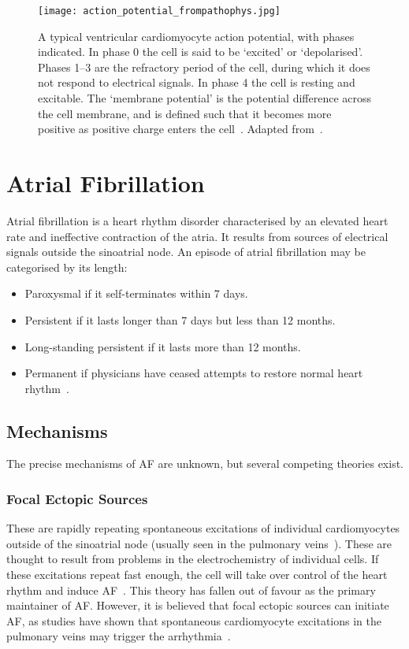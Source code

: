 \begin{figure}[h!] \begin{mdframed}
	\centering
	\texttt{[image: action\_potential\_frompathophys.jpg]}	
	\caption{A typical ventricular cardiomyocyte action potential, with phases indicated. In phase 0 the cell is said to be `excited' or `depolarised'. Phases 1--3 are the refractory period of the cell, during which it does not respond to electrical signals. In phase 4 the cell is resting and excitable. The `membrane potential' is the potential difference across the cell membrane, and is defined such that it becomes more positive as positive charge enters the cell~\cite{nattel}. Adapted from~\cite{pathophys}.}
	\label{fig:atrialcap}
\end{mdframed} \end{figure}

\section{Atrial Fibrillation}

Atrial fibrillation is a heart rhythm disorder characterised by an elevated heart rate and ineffective contraction of the atria. It results from sources of electrical signals outside the sinoatrial node.
An episode of atrial fibrillation may be categorised by its length:
\begin{itemize}
    \item Paroxysmal if it self-terminates within 7 days.
    \item Persistent if it lasts longer than 7 days but less than 12 months.
    \item Long-standing persistent if it lasts more than 12 months.
    \item Permanent if physicians have ceased attempts to restore normal heart rhythm~\cite{uptodate}.
\end{itemize}

\subsection{Mechanisms}

The precise mechanisms of AF are unknown, but several competing theories exist.

\subsubsection{Focal Ectopic Sources} 

These are rapidly repeating spontaneous excitations of individual cardiomyocytes outside of the sinoatrial node (usually seen in the pulmonary veins~\cite{uptodate, haissaguerre1998spontaneous}). These are thought to result from problems in the electrochemistry of individual cells. If these excitations repeat fast enough, the cell will take over control of the heart rhythm and induce AF~\cite{nattel}.
This theory has fallen out of favour as the primary maintainer of AF. However, it is believed that focal ectopic sources can initiate AF, as studies have shown that spontaneous cardiomyocyte excitations in the pulmonary veins may trigger the arrhythmia~\cite{haissaguerre1998spontaneous}.
	
